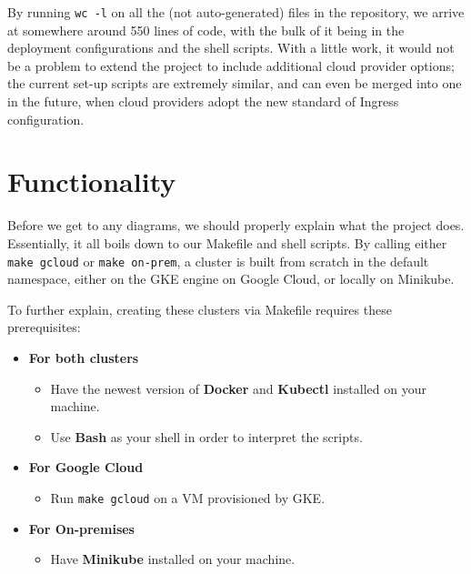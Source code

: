 \documentclass[thesis=B,english]{FITthesis}[2019/12/23]
\begin{document}
By running \verb|wc -l| on all the (not auto-generated) files in the repository, we arrive at somewhere around 550 lines of code, with the bulk of it being in the deployment configurations and the shell scripts. With a little work, it would not be a problem to extend the project to include additional cloud provider options; the current set-up scripts are extremely similar, and can even be merged into one in the future, when cloud providers adopt the new standard of Ingress configuration.

\section{Functionality}

Before we get to any diagrams, we should properly explain what the project does. Essentially, it all boils down to our Makefile and shell scripts. By calling either \verb|make gcloud| or \verb|make on-prem|, a cluster is built from scratch in the default namespace, either on the GKE engine on Google Cloud, or locally on Minikube.

To further explain, creating these clusters via Makefile requires these prerequisites:

\begin{itemize}
  \setlength\itemsep{0em}
  \item \textbf{For both clusters}
  
  \begin{itemize}
    \setlength\itemsep{0em}
    \item Have the newest version of \textbf{Docker} and \textbf{Kubectl} installed on your machine.
    \item Use \textbf{Bash} as your shell in order to interpret the scripts.
  \end{itemize} 
  \item \textbf{For Google Cloud}
  
  \begin{itemize}
    \setlength\itemsep{0em}
    \item Run \verb|make gcloud| on a VM provisioned by GKE.
  \end{itemize}
  \item \textbf{For On-premises}
  
  \begin{itemize}
    \setlength\itemsep{0em}
    \item Have \textbf{Minikube} installed on your machine.
  \end{itemize}
\end{itemize}
\end{document}
